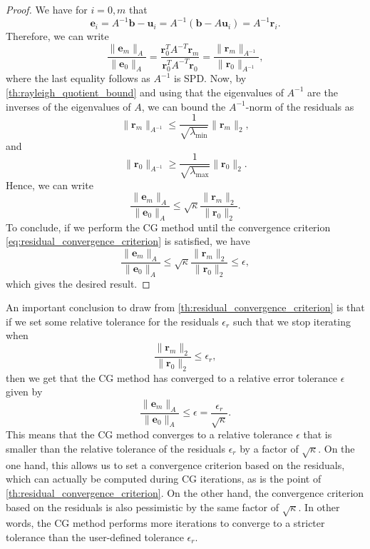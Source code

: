\begin{proof}
  We have for $i=0,m$ that
  \[
    \mathbf{e}_i = A^{-1}\mathbf{b} - \mathbf{u}_i = A^{-1}(\mathbf{b} - A\mathbf{u}_i) = A^{-1}\mathbf{r}_i.
  \]
  Therefore, we can write
  \[
    \frac{\|\mathbf{e}_m\|_A}{\|\mathbf{e}_0\|_A} = \frac{\mathbf{r}_0^TA^{-T}\mathbf{r}_m}{\mathbf{r}_0^TA^{-T}\mathbf{r}_0} = \frac{\|\mathbf{r}_m\|_{A^{-1}}}{\|\mathbf{r}_0\|_{A^{-1}}},
  \]
  where the last equality follows as $A^{-1}$ is SPD. Now, by \cref{th:rayleigh_quotient_bound} and using that the eigenvalues of $A^{-1}$ are the inverses of the eigenvalues of $A$, we can bound the $A^{-1}$-norm of the residuals as
  \[
    \|\mathbf{r}_m\|_{A^{-1}}  \leq \frac{1}{\sqrt{\lambda_{\text{min}}}} \|\mathbf{r}_m\|_2,
  \]
  and
  \[
    \|\mathbf{r}_0\|_{A^{-1}} \geq \frac{1}{\sqrt{\lambda_{\text{max}}}} \|\mathbf{r}_0\|_2.
  \]
  Hence, we can write
  \[
    \frac{\|\mathbf{e}_m\|_A}{\|\mathbf{e}_0\|_A} \leq \sqrt{\kappa} \frac{\|\mathbf{r}_m\|_2}{\|\mathbf{r}_0\|_2}.
  \]
  To conclude, if we perform the CG method until the convergence criterion \cref{eq:residual_convergence_criterion} is satisfied, we have
  \[
    \frac{\|\mathbf{e}_m\|_A}{\|\mathbf{e}_0\|_A} \leq \sqrt{\kappa} \frac{\|\mathbf{r}_m\|_2}{\|\mathbf{r}_0\|_2} \leq \epsilon,
  \]
  which gives the desired result.
\end{proof}
An important conclusion to draw from \cref{th:residual_convergence_criterion} is that if we set some relative tolerance for the residuals $\epsilon_r$ such that we stop iterating when 
\begin{equation}
  \frac{\|\mathbf{r}_m\|_2}{\|\mathbf{r}_0\|_2} \leq \epsilon_r,
  \label{eq:residual_convergence_criterion_r}
\end{equation}
then we get that the CG method has converged to a relative error tolerance $\epsilon$ given by
\[
  \frac{\|\mathbf{e}_m\|_A}{\|\mathbf{e}_0\|_A} \leq \epsilon = \frac{\epsilon_r}{\sqrt{\kappa}}.
\]
This means that the CG method converges to a relative tolerance $\epsilon$ that is smaller than the relative tolerance of the residuals $\epsilon_r$ by a factor of $\sqrt{\kappa}$. On the one hand, this allows us to set a convergence criterion based on the residuals, which can actually be computed during CG iterations, as is the point of \cref{th:residual_convergence_criterion}. On the other hand, the convergence criterion based on the residuals is also pessimistic by the same factor of $\sqrt{\kappa}$. In other words, the CG method performs more iterations to converge to a stricter tolerance than the user-defined tolerance $\epsilon_r$.

